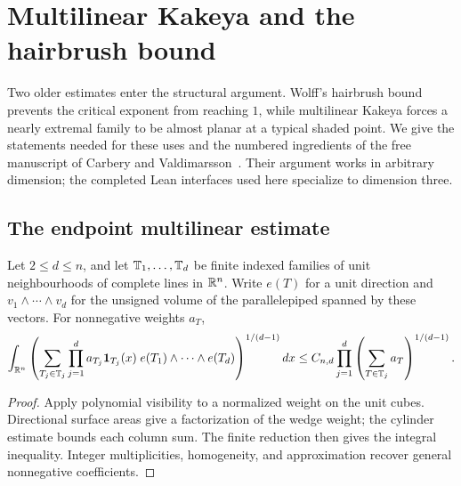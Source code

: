 \chapter{Multilinear Kakeya and the hairbrush bound}
\label{chap:multilinear}

Two older estimates enter the structural argument. Wolff's hairbrush
bound prevents the critical exponent from reaching $1$, while
multilinear Kakeya forces a nearly extremal family to be almost planar
at a typical shaded point. We give the statements needed for these
uses and the numbered ingredients of the free manuscript of Carbery
and Valdimarsson~\cite{CV}. Their argument works in arbitrary dimension;
the completed Lean interfaces used here specialize to dimension three.

\section{The endpoint multilinear estimate}

\begin{theorem}
\label{thm:cv-general}
Let $2\leq d\leq n$, and let $\mathbb{T}_1,\ldots,\mathbb{T}_d$ be finite indexed
families of unit neighbourhoods of complete lines in $\mathbb{R}^n$. Write
$e(T)$ for a unit direction and
$v_1\wedge\cdots\wedge v_d$ for the unsigned volume of the
parallelepiped spanned by these vectors. For nonnegative weights $a_T$,
\[
 \int_{\mathbb{R}^n}
 \left(\sum_{T_j\in\mathbb{T}_j}
     \prod_{j=1}^d a_{T_j}\mathbf{1}_{T_j}(x)
     \;e(T_1)\wedge\cdots\wedge e(T_d)\right)^{1/(d-1)}dx
 \leq C_{n,d}\prod_{j=1}^d
                  \left(\sum_{T\in\mathbb{T}_j}a_T\right)^{1/(d-1)}.
\]
\end{theorem}
\begin{proof}
Apply polynomial visibility to a normalized weight on the unit cubes.
Directional surface areas give a factorization of the wedge weight;
the cylinder estimate bounds each column sum. The finite reduction
then gives the integral inequality. Integer multiplicities, homogeneity,
and approximation recover general nonnegative coefficients.
\end{proof}

